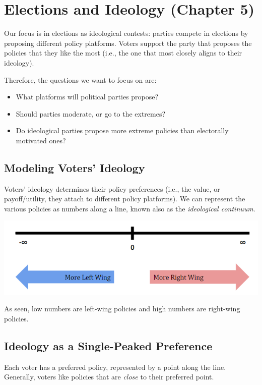 \documentclass[letterpaper]{article}
\begin{document}
\newpage
\section{Elections and Ideology (Chapter 5)}
Our focus is in elections as ideological contests: parties compete in elections by proposing different policy platforms. Voters support the party that proposes the policies that they like the most (i.e., the one that most closely aligns to their ideology). 

\bigskip 

Therefore, the questions we want to focus on are:
\begin{itemize}
    \item What platforms will political parties propose? 
    \item Should parties moderate, or go to the extremes? 
    \item Do ideological parties propose more extreme policies than electorally motivated ones?
\end{itemize}

\subsection{Modeling Voters' Ideology}
Voters' ideology determines their policy preferences (i.e., the value, or payoff/utility, they attach to different policy platforms). We can represent the various policies as numbers along a line, known also as the \emph{ideological continuum}.
\begin{center}
    \includegraphics[scale=0.9]{assets/continuum.png}
\end{center}
As seen, low numbers are left-wing policies and high numbers are right-wing policies.

\subsection{Ideology as a Single-Peaked Preference}
Each voter has a preferred policy, represented by a point along the line. Generally, voters like policies that are \emph{close} to their preferred point. 
\end{document}
